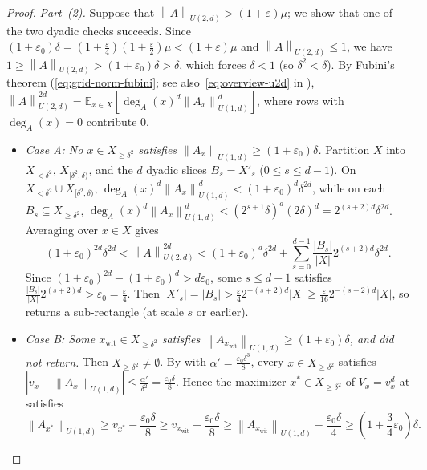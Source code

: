\documentclass[11pt]{article}
\theoremstyle{definition}
\newcommand{\E}{\mathbb{E}}
\newcommand{\norm}[1]{\left\lVert #1 \right\rVert}
\newcommand{\abs}[1]{\left\lvert #1 \right\rvert}
\begin{document}
\begin{proof}
\emph{Part~(2).} Suppose that $\norm{A}_{U(2, d)} > (1 + \varepsilon)\mu$; we show that one of the two dyadic checks succeeds. Since $(1 + \varepsilon_0)\delta = (1 + \frac{\varepsilon}{4})(1 + \frac{\varepsilon}{2})\mu < (1 + \varepsilon)\mu$ and $\norm{A}_{U(2, d)} \le 1$, we have $1 \ge \norm{A}_{U(2, d)} > (1 + \varepsilon_0)\delta > \delta$, which forces $\delta < 1$ (so $\delta^2 < \delta$). By Fubini's theorem (\eqref{eq:grid-norm-fubini}; see also~\eqref{eq:overview-u2d} in ), $\norm{A}_{U(2, d)}^{2d} = \E_{x \in X}[\deg_A(x)^d \norm{A_x}_{U(1, d)}^d]$, where rows with $\deg_A(x) = 0$ contribute $0$.
\begin{itemize}[leftmargin=*]
    \item \emph{Case A: No $x \in X_{\ge \delta^2}$ satisfies $\norm{A_x}_{U(1, d)} \ge (1 + \varepsilon_0)\delta$.}
    Partition $X$ into $X_{<\delta^2}$, $X_{[\delta^2, \delta)}$, and the $d$ dyadic slices $B_s = X'_s$ ($0 \le s \le d-1$). On $X_{<\delta^2} \cup X_{[\delta^2, \delta)}$, $\deg_A(x)^d \norm{A_x}_{U(1, d)}^d < (1 + \varepsilon_0)^d\delta^{2d}$, while on each $B_s \subseteq X_{\ge \delta^2}$, $\deg_A(x)^d\norm{A_x}_{U(1, d)}^d < (2^{s+1}\delta)^d(2\delta)^d = 2^{(s+2)d}\delta^{2d}$. Averaging over $x \in X$ gives
    \[
        (1 + \varepsilon_0)^{2d}\delta^{2d} < \norm{A}_{U(2, d)}^{2d} < (1 + \varepsilon_0)^d\delta^{2d} + \sum_{s=0}^{d-1} \frac{\abs{B_s}}{\abs{X}} 2^{(s+2)d}\delta^{2d}.
    \]
    Since $(1 + \varepsilon_0)^{2d} - (1 + \varepsilon_0)^d > d\varepsilon_0$, some $s \le d-1$ satisfies $\frac{\abs{B_s}}{\abs{X}} 2^{(s+2)d} > \varepsilon_0 = \frac{\varepsilon}{4}$. Then $\abs{X'_s} = \abs{B_s} > \frac{\varepsilon}{4} 2^{-(s+2)d}\abs{X} \ge \frac{\varepsilon}{16} 2^{-(s+2)d}\abs{X}$, so  returns a sub-rectangle (at scale $s$ or earlier).
    \item \emph{Case B: Some $x_{\text{wit}} \in X_{\ge \delta^2}$ satisfies $\norm{A_{x_{\text{wit}}}}_{U(1, d)} \ge (1 + \varepsilon_0)\delta$, and  did not return.}
    Then $X_{\ge \delta^2} \ne \emptyset$. By  with $\alpha' = \frac{\varepsilon_0\delta^3}{8}$, every $x \in X_{\ge \delta^2}$ satisfies $\abs{v_x - \norm{A_x}_{U(1, d)}} \le \frac{\alpha'}{\delta^2} = \frac{\varepsilon_0\delta}{8}$. Hence the maximizer $x^* \in X_{\ge \delta^2}$ of $V_x = v_x^d$ at  satisfies
    \[
        \norm{A_{x^*}}_{U(1, d)} \ge v_{x^*} - \frac{\varepsilon_0\delta}{8} \ge v_{x_{\text{wit}}} - \frac{\varepsilon_0\delta}{8} \ge \norm{A_{x_{\text{wit}}}}_{U(1, d)} - \frac{\varepsilon_0\delta}{4} \ge \left(1 + \frac{3}{4}\varepsilon_0\right)\delta.
\]
\end{itemize}
\end{proof}
\end{document}
